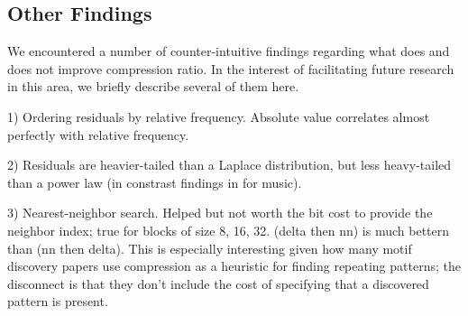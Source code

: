 \subsection{Other Findings}

We encountered a number of counter-intuitive findings regarding what does and does not improve compression ratio. In the interest of facilitating future research in this area, we briefly describe several of them here.

1) Ordering residuals by relative frequency. Absolute value correlates almost perfectly with relative frequency. %

2) Residuals are heavier-tailed than a Laplace distribution, but less heavy-tailed than a power law (in constrast findings in \cite{shorten} for music).

3) Nearest-neighbor search. Helped but not worth the bit cost to provide the neighbor index; true for blocks of size 8, 16, 32. (delta then nn) is much bettern than (nn then delta). This is especially interesting given how many motif discovery papers use compression as a heuristic for finding repeating patterns; the disconnect is that they don't include the cost of specifying that a discovered pattern is present.

